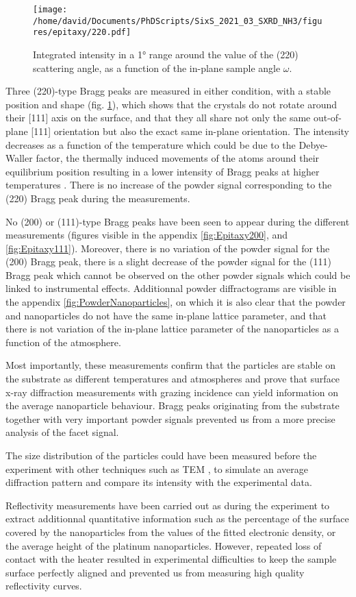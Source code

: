 \begin{figure}[!htb]
    \centering
    \texttt{[image: /home/david/Documents/PhDScripts/SixS\_2021\_03\_SXRD\_NH3/figures/epitaxy/220.pdf]}
    \caption{
        Integrated intensity in a \ang{1} range around the value of the (220) scattering angle, as a function of the in-plane sample angle $\omega$.
    }
    \label{fig:Epitaxy220}
\end{figure}

Three (220)-type Bragg peaks are measured in either condition, with a stable position and shape (fig. \ref{fig:Epitaxy220}), which shows that the crystals do not rotate around their [111] axis on the surface, and that they all share not only the same out-of-plane [111] orientation but also the exact same in-plane orientation.
The intensity decreases as a function of the temperature which could be due to the Debye-Waller factor, the thermally induced movements of the atoms around their equilibrium position resulting in a lower intensity of Bragg peaks at higher temperatures \parencite{Willmott}.
There is no increase of the powder signal corresponding to the (220) Bragg peak during the measurements.

No (200) or (111)-type Bragg peaks have been seen to appear during the different measurements (figures visible in the appendix \ref{fig:Epitaxy200}, and \ref{fig:Epitaxy111}).
Moreover, there is no variation of the powder signal for the (200) Bragg peak, there is a slight decrease of the powder signal for the (111) Bragg peak which cannot be observed on the other powder signals which could be linked to instrumental effects.
Additionnal powder diffractograms are visible in the appendix \ref{fig:PowderNanoparticles}, on which it is also clear that the powder and nanoparticles do not have the same in-plane lattice parameter, and that there is not variation of the in-plane lattice parameter of the nanoparticles as a function of the atmosphere.

Most importantly, these measurements confirm that the particles are stable on the substrate as different temperatures and atmospheres and prove that surface x-ray diffraction measurements with grazing incidence can yield information on the average nanoparticle behaviour.
Bragg peaks originating from the  substrate together with very important powder signals prevented us from a more precise analysis of the facet signal.

The size distribution of the particles could have been measured before the experiment with other techniques such as TEM \parencite{Hejral2013}, to simulate an average diffraction pattern and compare its intensity with the experimental data.

Reflectivity measurements have been carried out as during the experiment to extract additionnal quantitative information such as the percentage of the surface covered by the nanoparticles from the values of the fitted electronic density, or the average height of the platinum nanoparticles.
However, repeated loss of contact with the heater resulted in experimental difficulties to keep the sample surface perfectly aligned and prevented us from measuring high quality reflectivity curves.